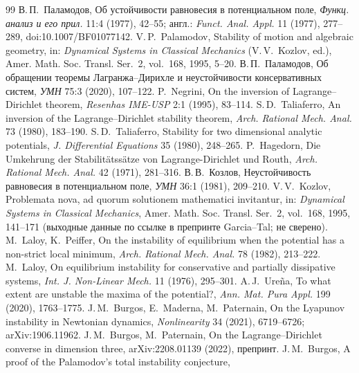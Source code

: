\documentclass[11pt,a4paper]{article}
\theoremstyle{definition}
\begin{document}
\begin{thebibliography}{99}
 В.\,П.~Паламодов, Об устойчивости равновесия в потенциальном поле,
\emph{Функц. анализ и его прил.} 11:4 (1977), 42--55; англ.: \emph{Funct. Anal. Appl.} 11
(1977), 277--289, doi:10.1007/BF01077142.
 V.\,P.~Palamodov, Stability of motion and algebraic geometry, in:
\emph{Dynamical Systems in Classical Mechanics} (V.\,V.~Kozlov, ed.), Amer. Math. Soc. Transl.
Ser.~2, vol.~168, 1995, 5--20.
 В.\,П.~Паламодов, Об обращении теоремы Лагранжа--Дирихле и неустойчивости
консервативных систем, \emph{УМН} 75:3 (2020), 107--122.
 P.~Negrini, On the inversion of Lagrange--Dirichlet theorem,
\emph{Resenhas IME-USP} 2:1 (1995), 83--114.
 S.\,D.~Taliaferro, An inversion of the Lagrange--Dirichlet stability theorem,
\emph{Arch. Rational Mech. Anal.} 73 (1980), 183--190.
 S.\,D.~Taliaferro, Stability for two dimensional analytic potentials,
\emph{J. Differential Equations} 35 (1980), 248--265.
 P.~Hagedorn, Die Umkehrung der Stabilitätssätze von Lagrange-Dirichlet und
Routh, \emph{Arch. Rational Mech. Anal.} 42 (1971), 281--316.
 В.\,В.~Козлов, Неустойчивость равновесия в потенциальном поле, \emph{УМН}
36:1 (1981), 209--210.
 V.\,V.~Kozlov, Problemata nova, ad quorum solutionem mathematici
invitantur, in: \emph{Dynamical Systems in Classical Mechanics}, Amer. Math. Soc. Transl. Ser.~2,
vol.~168, 1995, 141--171 (выходные данные по ссылке в препринте Garcia--Tal; не сверено).
 M.~Laloy, K.~Peiffer, On the instability of equilibrium when the potential
has a non-strict local minimum, \emph{Arch. Rational Mech. Anal.} 78 (1982), 213--222.
 M.~Laloy, On equilibrium instability for conservative and partially
dissipative systems, \emph{Int. J. Non-Linear Mech.} 11 (1976), 295--301.
 A.\,J.~Ureña, To what extent are unstable the maxima of the potential?,
\emph{Ann. Mat. Pura Appl.} 199 (2020), 1763--1775.
 J.\,M.~Burgos, E.~Maderna, M.~Paternain, On the Lyapunov instability in
Newtonian dynamics, \emph{Nonlinearity} 34 (2021), 6719--6726; arXiv:1906.11962.
 J.\,M.~Burgos, M.~Paternain, On the Lagrange--Dirichlet converse in
dimension three, arXiv:2208.01139 (2022), препринт.
 J.\,M.~Burgos, A proof of the Palamodov's total instability conjecture,

\end{thebibliography}
\end{document}
